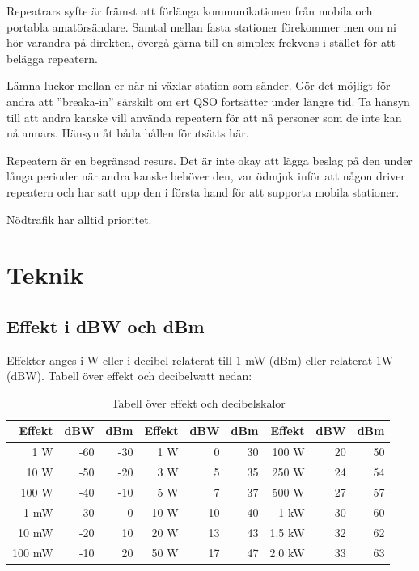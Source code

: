 Repeatrars syfte är främst att förlänga kommunikationen från mobila och portabla amatörsändare. Samtal mellan fasta stationer förekommer men om ni hör varandra på direkten, övergå gärna till en simplex-frekvens i stället för att belägga repeatern.

Lämna luckor mellan er när ni växlar station som sänder. Gör det möjligt för andra att ''breaka-in'' särskilt om ert QSO fortsätter under längre tid. Ta hänsyn till att andra kanske vill använda repeatern för att nå personer som de inte kan nå annars. Hänsyn åt båda hållen förutsätts här. 

Repeatern är en begränsad resurs. Det är inte okay att lägga beslag på den under långa perioder när andra kanske behöver den, var ödmjuk inför att någon driver repeatern och har satt upp den i första hand för att supporta mobila stationer.

Nödtrafik har alltid prioritet.



\newpage

\section{Teknik}

\subsection{Effekt i dBW och dBm}

Effekter anges i W eller i decibel relaterat till 1 mW (dBm) eller relaterat 1W (dBW). Tabell över effekt och decibelwatt nedan:
\begin{table}[h]
\centering
\begin{tabular}{rrr|rrr|rrr}
	\textbf{Effekt} & \textbf{dBW} & \textbf{dBm} & \textbf{Effekt} & \textbf{dBW} & \textbf{dBm} & \textbf{Effekt} & \textbf{dBW} & \textbf{dBm} \\ \hline
	    1 \textmu W &          -60 &          -30 &             1 W &            0 &           30 &           100 W &           20 &           50 \\
	   10 \textmu W &          -50 &          -20 &             3 W &            5 &           35 &           250 W &           24 &           54 \\
	  100 \textmu W &          -40 &          -10 &             5 W &            7 &           37 &           500 W &           27 &           57 \\
	           1 mW &          -30 &            0 &            10 W &           10 &           40 &            1 kW &           30 &           60 \\
	          10 mW &          -20 &           10 &            20 W &           13 &           43 &          1.5 kW &           32 &           62 \\
	         100 mW &          -10 &           20 &            50 W &           17 &           47 &          2.0 kW &           33 &           63
\end{tabular}
\caption{Tabell över effekt och decibelskalor}
\end{table}

